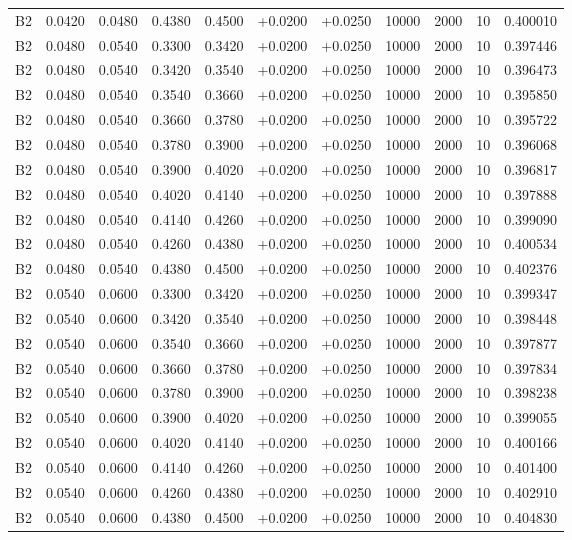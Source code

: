 \documentclass{article}
\begin{document}
\begin{longtable}{l r r r r r r r r r l}
B2 & 0.0420 & 0.0480 & 0.4380 & 0.4500 & +0.0200 & +0.0250 & 10000 & 2000 & 10 & 0.400010 \\
B2 & 0.0480 & 0.0540 & 0.3300 & 0.3420 & +0.0200 & +0.0250 & 10000 & 2000 & 10 & 0.397446 \\
B2 & 0.0480 & 0.0540 & 0.3420 & 0.3540 & +0.0200 & +0.0250 & 10000 & 2000 & 10 & 0.396473 \\
B2 & 0.0480 & 0.0540 & 0.3540 & 0.3660 & +0.0200 & +0.0250 & 10000 & 2000 & 10 & 0.395850 \\
B2 & 0.0480 & 0.0540 & 0.3660 & 0.3780 & +0.0200 & +0.0250 & 10000 & 2000 & 10 & 0.395722 \\
B2 & 0.0480 & 0.0540 & 0.3780 & 0.3900 & +0.0200 & +0.0250 & 10000 & 2000 & 10 & 0.396068 \\
B2 & 0.0480 & 0.0540 & 0.3900 & 0.4020 & +0.0200 & +0.0250 & 10000 & 2000 & 10 & 0.396817 \\
B2 & 0.0480 & 0.0540 & 0.4020 & 0.4140 & +0.0200 & +0.0250 & 10000 & 2000 & 10 & 0.397888 \\
B2 & 0.0480 & 0.0540 & 0.4140 & 0.4260 & +0.0200 & +0.0250 & 10000 & 2000 & 10 & 0.399090 \\
B2 & 0.0480 & 0.0540 & 0.4260 & 0.4380 & +0.0200 & +0.0250 & 10000 & 2000 & 10 & 0.400534 \\
B2 & 0.0480 & 0.0540 & 0.4380 & 0.4500 & +0.0200 & +0.0250 & 10000 & 2000 & 10 & 0.402376 \\
B2 & 0.0540 & 0.0600 & 0.3300 & 0.3420 & +0.0200 & +0.0250 & 10000 & 2000 & 10 & 0.399347 \\
B2 & 0.0540 & 0.0600 & 0.3420 & 0.3540 & +0.0200 & +0.0250 & 10000 & 2000 & 10 & 0.398448 \\
B2 & 0.0540 & 0.0600 & 0.3540 & 0.3660 & +0.0200 & +0.0250 & 10000 & 2000 & 10 & 0.397877 \\
B2 & 0.0540 & 0.0600 & 0.3660 & 0.3780 & +0.0200 & +0.0250 & 10000 & 2000 & 10 & 0.397834 \\
B2 & 0.0540 & 0.0600 & 0.3780 & 0.3900 & +0.0200 & +0.0250 & 10000 & 2000 & 10 & 0.398238 \\
B2 & 0.0540 & 0.0600 & 0.3900 & 0.4020 & +0.0200 & +0.0250 & 10000 & 2000 & 10 & 0.399055 \\
B2 & 0.0540 & 0.0600 & 0.4020 & 0.4140 & +0.0200 & +0.0250 & 10000 & 2000 & 10 & 0.400166 \\
B2 & 0.0540 & 0.0600 & 0.4140 & 0.4260 & +0.0200 & +0.0250 & 10000 & 2000 & 10 & 0.401400 \\
B2 & 0.0540 & 0.0600 & 0.4260 & 0.4380 & +0.0200 & +0.0250 & 10000 & 2000 & 10 & 0.402910 \\
B2 & 0.0540 & 0.0600 & 0.4380 & 0.4500 & +0.0200 & +0.0250 & 10000 & 2000 & 10 & 0.404830 \\
\end{longtable}
\end{document}
